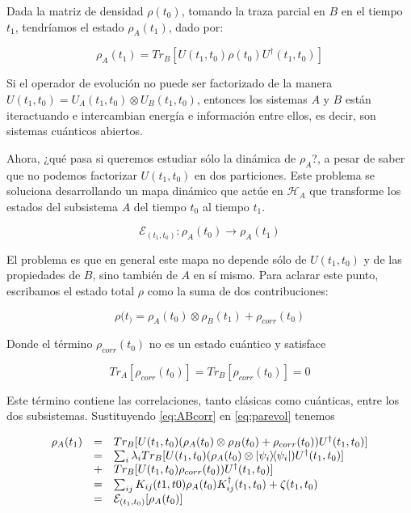 Dada la matriz de densidad $\rho(t_0)$, tomando la traza parcial en $B$ en el tiempo $t_1$, tendríamos el estado $\rho_A(t_1)$, dado por:

\begin{equation}
    \rho_A(t_1) = Tr_B[U(t_1, t_0) \rho(t_0) U^\dagger(t_1, t_0)]
    \label{eq:parevol}
\end{equation}

Si el operador de evolución no puede ser factorizado de la manera $U(t_1, t_0) = U_A(t_1, t_0) \otimes U_B(t_1, t_0)$, entonces los sistemas $A$ y $B$ están iteractuando e intercambian energía e información entre ellos, es decir, son sistemas cuánticos abiertos.

Ahora, ¿qué pasa si queremos estudiar sólo la dinámica de $\rho_A$?, a pesar de saber que no podemos factorizar $U(t_1, t_0)$ en dos particiones. Este problema se soluciona desarrollando un mapa dinámico que actúe en $\mathcal{H}_A$ que transforme los estados del subsistema $A$ del tiempo $t_0$ al tiempo $t_1$.

\begin{equation}
    \mathcal{E}_{(t_1, t_0)} : \rho_A(t_0) \rightarrow \rho_A(t_1)
\end{equation}

El problema es que en general este mapa no depende sólo de $U(t_1, t_0)$ y de las propiedades de $B$, sino también de $A$ en sí mismo. Para aclarar este punto, escribamos el estado total $\rho$ como la suma de dos contribuciones:

\begin{equation}
    \rho(t_) = \rho_A(t_0) \otimes \rho_B(t_1) + \rho_{corr}(t_0)
    \label{eq:ABcorr}
\end{equation}

Donde el término $\rho_{corr}(t_0)$ no es un estado cuántico y satisface

\begin{equation}
    Tr_A[\rho_{corr}(t_0)] = Tr_B[\rho_{corr}(t_0)] = 0
\end{equation}

Este término contiene las correlaciones, tanto clásicas como cuánticas, entre los dos subsistemas. Sustituyendo  \ref{eq:ABcorr} en \ref{eq:parevol} tenemos

\begin{equation}
    \begin{array}{r c l}
        \rho_A(t_1)
        &=& Tr_B[U(t_1, t_0) (\rho_A(t_0) \otimes \rho_B(t_0) + \rho_{corr}(t_0)) U^\dagger(t_1, t_0)] \\
        &=& \sum_i \lambda_i Tr_B[U(t_1, t_0) (\rho_A(t_0) \otimes \ketbra{\psi_i}) U^\dagger(t_1, t_0)] \\ &+& Tr_B[U(t_1, t_0) \rho_{corr}(t_0)) U^\dagger(t_1, t_0)] \\
        &=& \sum_{ij} K_{ij}(t1, t0) \rho_A(t_0) K_{ij}^\dagger(t_1, t_0) + \zeta(t_1, t_0) \\
        &=& \mathcal{E}_{(t_1, t_0)}[\rho_A(t_0)]
    \end{array}
\end{equation}

